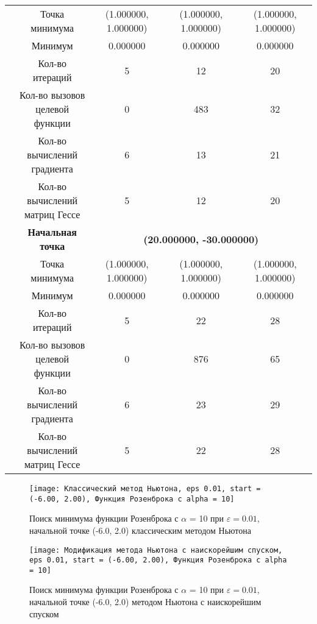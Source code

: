 \begin{table}[H]
\begin{tabular}{|c|c|c|c|c|}
	\cline{2-5}
	&Точка минимума &(1.000000, 1.000000) &(1.000000, 1.000000) &(1.000000, 1.000000) \\ 
	\cline{2-5}
	&Минимум &0.000000 &0.000000 &0.000000 \\ 
	\cline{2-5}
	&Кол-во итераций &5 &12 &20 \\ 
	\cline{2-5}
	&\makecell{Кол-во вызовов\\целевой функции} &0 &483 &32 \\ 
	\cline{2-5}
	&\makecell{Кол-во вычислений\\градиента} &6 &13 &21 \\ 
	\cline{2-5}
	&\makecell{Кол-во вычислений\\матриц Гессе} &5 &12 &20 \\ 
	\cline{2-5}
\cline{2-5}&\textbf{Начальная точка} &\multicolumn{3}{c|}{\textbf{(20.000000, -30.000000)}}\\
	\cline{2-5}
	&Точка минимума &(1.000000, 1.000000) &(1.000000, 1.000000) &(1.000000, 1.000000) \\ 
	\cline{2-5}
	&Минимум &0.000000 &0.000000 &0.000000 \\ 
	\cline{2-5}
	&Кол-во итераций &5 &22 &28 \\ 
	\cline{2-5}
	&\makecell{Кол-во вызовов\\целевой функции} &0 &876 &65 \\ 
	\cline{2-5}
	&\makecell{Кол-во вычислений\\градиента} &6 &23 &29 \\ 
	\cline{2-5}
	&\makecell{Кол-во вычислений\\матриц Гессе} &5 &22 &28 \\ 
	\cline{2-5}
	\hline

\end{tabular}
\end{table}


            \begin{figure}[H]
	        \centering
	        \texttt{[image: Классический метод Ньютона, eps 0.01, start = (-6.00, 2.00), Функция Розенброка с alpha = 10]}%
	        \caption{Поиск минимума функции Розенброка с $\alpha$ = 10 при $\varepsilon = 0.01$, начальной точке (-6.0, 2.0) классическим методом Ньютона}
	        \vspace*{-1.2cm}
            \end{figure}
            
            \begin{figure}[H]
	        \centering
	        \texttt{[image: Модификация метода Ньютона с наискорейшим спуском, eps 0.01, start = (-6.00, 2.00), Функция Розенброка с alpha = 10]}%
	        \caption{Поиск минимума функции Розенброка с $\alpha$ = 10 при $\varepsilon = 0.01$, начальной точке (-6.0, 2.0) методом Ньютона с наискорейшим спуском}
	        \vspace*{-1.2cm}
            \end{figure}
            
